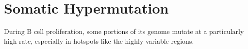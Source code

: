 \section{Somatic Hypermutation}
\label{Glossary:Somatic_Hypermutation}
During B cell proliferation, some portions of its genome mutate at a particularly high rate, especially in hotspots like the highly variable regions.
